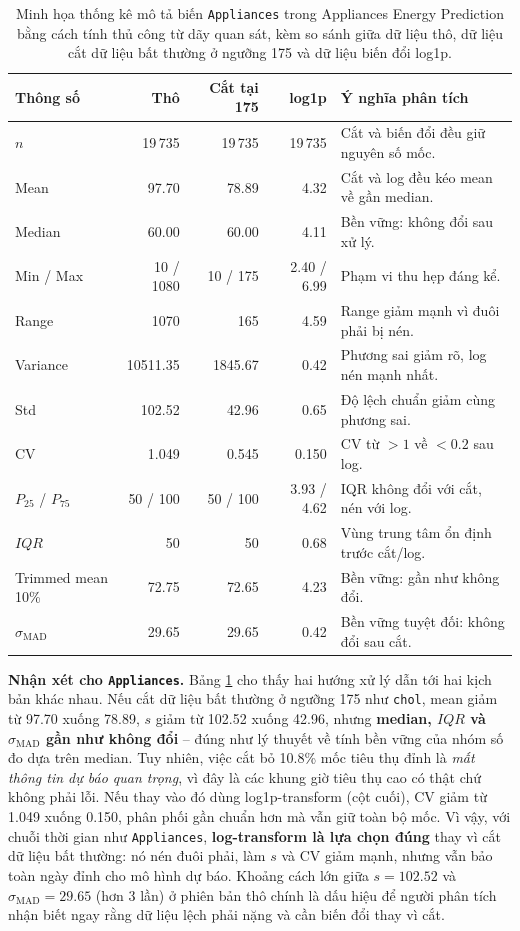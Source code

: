\begin{table}[H]
\centering
\caption[Minh họa thống kê mô tả biến \texttt{Appliances} Appliances Energy Prediction]{Minh họa thống kê mô tả biến \texttt{Appliances} trong Appliances Energy Prediction bằng cách tính thủ công từ dãy quan sát, kèm so sánh giữa dữ liệu thô, dữ liệu cắt dữ liệu bất thường ở ngưỡng 175 và dữ liệu biến đổi log1p.}
\label{tab:chapter1_appliances_detailed_stats}
\small
\begin{tabular}{lrrrp{}}
\toprule
Thông số & Thô & Cắt tại 175 & log1p & Ý nghĩa phân tích \\
\midrule
$n$ & 19\,735 & 19\,735 & 19\,735 & Cắt và biến đổi đều giữ nguyên số mốc. \\
Mean & 97.70 & 78.89 & 4.32 & Cắt và log đều kéo mean về gần median. \\
Median & 60.00 & 60.00 & 4.11 & Bền vững: không đổi sau xử lý. \\
Min / Max & 10 / 1080 & 10 / 175 & 2.40 / 6.99 & Phạm vi thu hẹp đáng kể. \\
Range & 1070 & 165 & 4.59 & Range giảm mạnh vì đuôi phải bị nén. \\
Variance & 10511.35 & 1845.67 & 0.42 & Phương sai giảm rõ, log nén mạnh nhất. \\
Std & 102.52 & 42.96 & 0.65 & Độ lệch chuẩn giảm cùng phương sai. \\
CV & 1.049 & 0.545 & 0.150 & CV từ $>1$ về $<0.2$ sau log. \\
$P_{25}$ / $P_{75}$ & 50 / 100 & 50 / 100 & 3.93 / 4.62 & IQR không đổi với cắt, nén với log. \\
$IQR$ & 50 & 50 & 0.68 & Vùng trung tâm ổn định trước cắt/log. \\
Trimmed mean 10\% & 72.75 & 72.65 & 4.23 & Bền vững: gần như không đổi. \\
$\hat{\sigma}_{\text{MAD}}$ & 29.65 & 29.65 & 0.42 & Bền vững tuyệt đối: không đổi sau cắt. \\
\bottomrule
\end{tabular}
\end{table}

\textbf{Nhận xét cho \texttt{Appliances}.} Bảng \ref{tab:chapter1_appliances_detailed_stats} cho thấy hai hướng xử lý dẫn tới hai kịch bản khác nhau. Nếu cắt dữ liệu bất thường ở ngưỡng 175 như \texttt{chol}, mean giảm từ 97.70 xuống 78.89, $s$ giảm từ 102.52 xuống 42.96, nhưng \textbf{median, $IQR$ và $\hat{\sigma}_{\text{MAD}}$ gần như không đổi} -- đúng như lý thuyết về tính bền vững của nhóm số đo dựa trên median. Tuy nhiên, việc cắt bỏ 10.8\% mốc tiêu thụ đỉnh là \textit{mất thông tin dự báo quan trọng}, vì đây là các khung giờ tiêu thụ cao có thật chứ không phải lỗi. Nếu thay vào đó dùng log1p-transform (cột cuối), CV giảm từ 1.049 xuống 0.150, phân phối gần chuẩn hơn mà vẫn giữ toàn bộ mốc. Vì vậy, với chuỗi thời gian như \texttt{Appliances}, \textbf{log-transform là lựa chọn đúng} thay vì cắt dữ liệu bất thường: nó nén đuôi phải, làm $s$ và CV giảm mạnh, nhưng vẫn bảo toàn ngày đỉnh cho mô hình dự báo. Khoảng cách lớn giữa $s=102.52$ và $\hat{\sigma}_{\text{MAD}}=29.65$ (hơn 3 lần) ở phiên bản thô chính là dấu hiệu để người phân tích nhận biết ngay rằng dữ liệu lệch phải nặng và cần biến đổi thay vì cắt.

